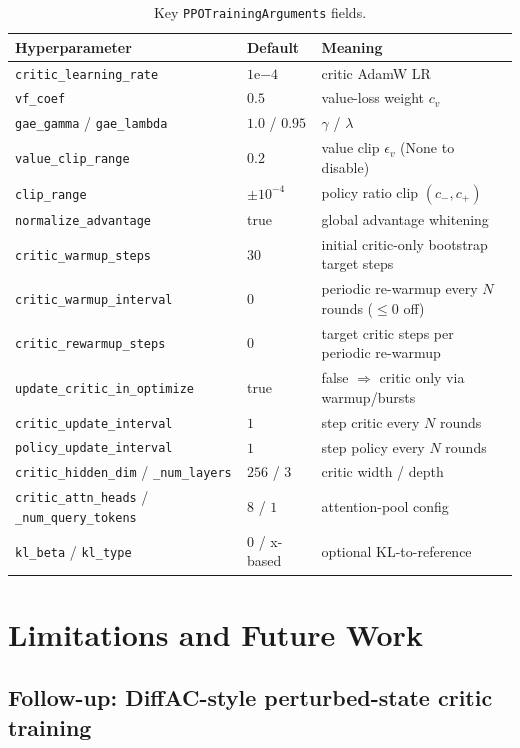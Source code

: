 \documentclass[11pt]{article}
\theoremstyle{plain}
\theoremstyle{remark}
\begin{document}
\begin{table}[h]
\centering
\small
\begin{tabular}{lll}
\toprule
Hyperparameter & Default & Meaning \\
\midrule
\texttt{critic\_learning\_rate} & $1\mathrm{e}{-4}$ & critic AdamW LR \\
\texttt{vf\_coef} & $0.5$ & value-loss weight $c_v$ \\
\texttt{gae\_gamma} / \texttt{gae\_lambda} & $1.0$ / $0.95$ & $\gamma$ / $\lambda$ \\
\texttt{value\_clip\_range} & $0.2$ & value clip $\epsilon_v$ (None to disable) \\
\texttt{clip\_range} & $\pm 10^{-4}$ & policy ratio clip $(c_-,c_+)$ \\
\texttt{normalize\_advantage} & true & global advantage whitening \\
\texttt{critic\_warmup\_steps} & $30$ & initial critic-only bootstrap target steps \\
\texttt{critic\_warmup\_interval} & $0$ & periodic re-warmup every $N$ rounds (${\le}0$ off) \\
\texttt{critic\_rewarmup\_steps} & $0$ & target critic steps per periodic re-warmup \\
\texttt{update\_critic\_in\_optimize} & true & false $\Rightarrow$ critic only via warmup/bursts \\
\texttt{critic\_update\_interval} & $1$ & step critic every $N$ rounds \\
\texttt{policy\_update\_interval} & $1$ & step policy every $N$ rounds \\
\texttt{critic\_hidden\_dim} / \texttt{\_num\_layers} & $256$ / $3$ & critic width / depth \\
\texttt{critic\_attn\_heads} / \texttt{\_num\_query\_tokens} & $8$ / $1$ & attention-pool config \\
\texttt{kl\_beta} / \texttt{kl\_type} & $0$ / x-based & optional KL-to-reference \\
\bottomrule
\end{tabular}
\caption{Key \texttt{PPOTrainingArguments} fields.}
\label{tab:hparams}
\end{table}

\section{Limitations and Future Work}
\label{sec:future}

\subsection{Follow-up: DiffAC-style perturbed-state critic training}
\label{sec:perturb-critic}
\end{document}
